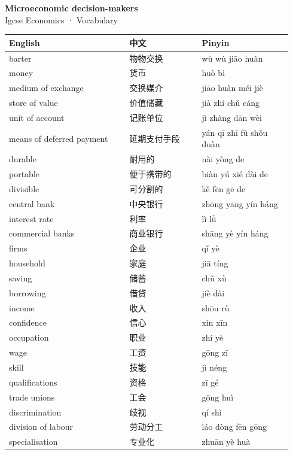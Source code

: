 \documentclass[11pt]{article}
\begin{document}
\begin{center}
  {\LARGE\bfseries Microeconomic decision-makers}\\[0.35em]
  {\large Igcse Economics · Vocabulary}
\end{center}
\vspace{0.6em}

\begin{longtable}{@{}p{0.40\linewidth}p{0.24\linewidth}p{0.30\linewidth}@{}}
\toprule
\textbf{English} & \textbf{中文} & \textbf{Pinyin} \\
\midrule
\endhead
\bottomrule
\endlastfoot
barter & 物物交换 & wù wù jiāo huàn \\
money & 货币 & huò bì \\
medium of exchange & 交换媒介 & jiāo huàn méi jiè \\
store of value & 价值储藏 & jià zhí chǔ cáng \\
unit of account & 记账单位 & jì zhàng dān wèi \\
means of deferred payment & 延期支付手段 & yán qī zhī fù shǒu duàn \\
durable & 耐用的 & nài yòng de \\
portable & 便于携带的 & biàn yú xié dài de \\
divisible & 可分割的 & kě fēn gē de \\
central bank & 中央银行 & zhōng yāng yín háng \\
interest rate & 利率 & lì lǜ \\
commercial banks & 商业银行 & shāng yè yín háng \\
firms & 企业 & qǐ yè \\
household & 家庭 & jiā tíng \\
saving & 储蓄 & chǔ xù \\
borrowing & 借贷 & jiè dài \\
income & 收入 & shōu rù \\
confidence & 信心 & xìn xīn \\
occupation & 职业 & zhí yè \\
wage & 工资 & gōng zī \\
skill & 技能 & jì néng \\
qualifications & 资格 & zī gé \\
trade unions & 工会 & gōng huì \\
discrimination & 歧视 & qí shì \\
division of labour & 劳动分工 & láo dòng fēn gōng \\
specialisation & 专业化 & zhuān yè huà \\

\end{longtable}
\end{document}
